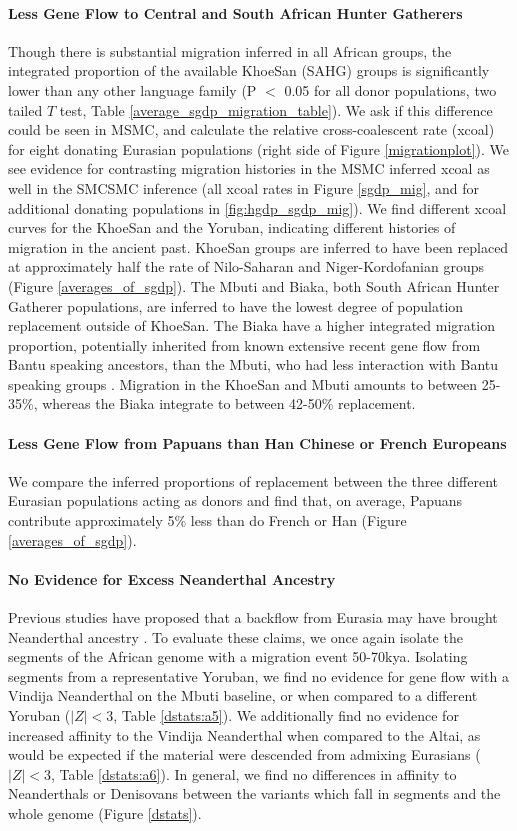 \documentclass{article}
\begin{document}
\paragraph{Less Gene Flow to Central and South African Hunter Gatherers} Though there is substantial migration inferred in all African groups, the integrated proportion of the available KhoeSan (SAHG) groups is significantly lower than any other language family (P $<$ 0.05 for all donor populations, two tailed $T$ test, Table \ref{average_sgdp_migration_table}). We ask if this difference could be seen in MSMC, and calculate the relative cross-coalescent rate (xcoal) for eight donating Eurasian populations (right side of Figure \ref{migrationplot}). We see evidence for contrasting migration histories in the MSMC inferred xcoal as well in the SMCSMC inference (all xcoal rates in Figure \ref{sgdp_mig}, and for additional donating populations in \ref{fig:hgdp_sgdp_mig}). We find different xcoal curves for the KhoeSan and the Yoruban, indicating different histories of migration in the ancient past. KhoeSan groups are inferred to have been replaced at approximately half the rate of Nilo-Saharan and Niger-Kordofanian groups (Figure \ref{averages_of_sgdp}). The Mbuti and Biaka, both South African Hunter Gatherer populations, are inferred to have the lowest degree of population replacement outside of KhoeSan. The Biaka have a higher integrated migration proportion, potentially inherited from known extensive recent gene flow from Bantu speaking ancestors, than the Mbuti, who had less interaction with Bantu speaking groups \cite{Patin2017}. Migration in the KhoeSan and Mbuti amounts to between 25-35\%, whereas the Biaka integrate to between 42-50\% replacement.  

\paragraph{Less Gene Flow from Papuans than Han Chinese or French Europeans} We compare the inferred proportions of replacement between the three different Eurasian populations acting as donors and find that, on average, Papuans contribute approximately 5\% less than do French or Han (Figure \ref{averages_of_sgdp}). 

\paragraph{No Evidence for Excess Neanderthal Ancestry} Previous studies have proposed that a backflow from Eurasia may have brought Neanderthal ancestry \cite{Chen2020}. To evaluate these claims, we once again isolate the segments of the African genome with a migration event 50-70kya. Isolating segments from a representative Yoruban, we find no evidence for gene flow with a Vindija Neanderthal on the Mbuti baseline, or when compared to a different Yoruban ($|Z|<3$, Table \ref{dstats:a5}). We additionally find no evidence for increased affinity to the Vindija Neanderthal when compared to the Altai, as would be expected if the material were descended from admixing Eurasians ($|Z|<3$, Table \ref{dstats:a6}). In general, we find no differences in affinity to Neanderthals or Denisovans between the variants which fall in segments and the whole genome (Figure \ref{dstats}). 
\end{document}
